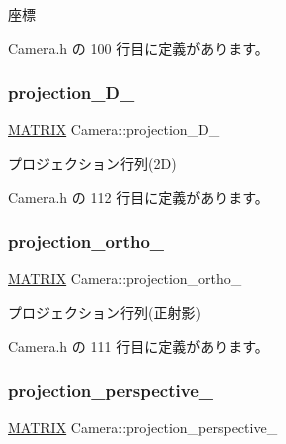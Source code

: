 座標 



 Camera.\+h の 100 行目に定義があります。

\mbox{\label{class_camera_a67951793f883b6b9372ea08213278eee}} 
\subsubsection{\texorpdfstring{projection\+\_\+D\+\_\+}{projection\_2D\_}}
{\footnotesize\ttfamily \mbox{\hyperlink{_vector3_d_8h_a032295cd9fb1b711757c90667278e744}{M\+A\+T\+R\+IX}} Camera\+::projection\+\_\+D\+\_\+\hspace{0.3cm}{\ttfamily [private]}}



プロジェクション行列(2\+D) 



 Camera.\+h の 112 行目に定義があります。

\mbox{\label{class_camera_a624f360dabc01f89cc988ca16599eff4}} 
\subsubsection{\texorpdfstring{projection\+\_\+ortho\+\_\+}{projection\_ortho\_}}
{\footnotesize\ttfamily \mbox{\hyperlink{_vector3_d_8h_a032295cd9fb1b711757c90667278e744}{M\+A\+T\+R\+IX}} Camera\+::projection\+\_\+ortho\+\_\+\hspace{0.3cm}{\ttfamily [private]}}



プロジェクション行列(正射影) 



 Camera.\+h の 111 行目に定義があります。

\mbox{\label{class_camera_ab0abb153efc1642da91ec0716847231c}} 
\subsubsection{\texorpdfstring{projection\+\_\+perspective\+\_\+}{projection\_perspective\_}}
{\footnotesize\ttfamily \mbox{\hyperlink{_vector3_d_8h_a032295cd9fb1b711757c90667278e744}{M\+A\+T\+R\+IX}} Camera\+::projection\+\_\+perspective\+\_\+\hspace{0.3cm}{\ttfamily [private]}}



